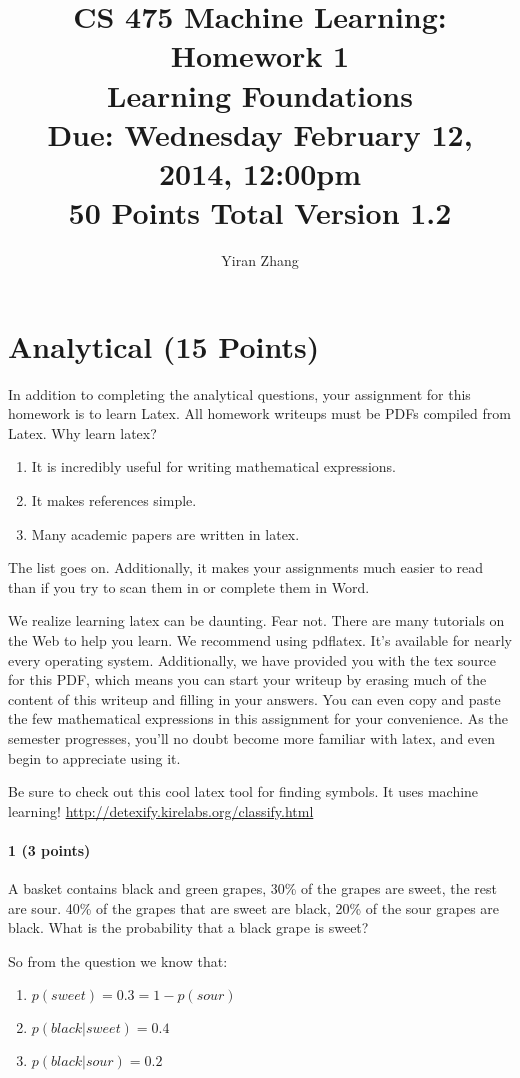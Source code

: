 \documentclass[11pt]{article}
\title{CS 475 Machine Learning: Homework 1\\Learning Foundations\\
\Large{Due: Wednesday February 12, 2014, 12:00pm}\\
50 Points Total \hspace{1cm} Version 1.2}
\author{Yiran Zhang}
\date{}
\begin{document}
\large
\maketitle
\thispagestyle{headings}

\vspace{-.5in}
\section{Analytical (15 Points)}
In addition to completing the analytical questions, your assignment for this homework is to learn Latex. All homework writeups must be PDFs compiled from Latex. Why learn latex?
\begin{enumerate}
\item It is incredibly useful for writing mathematical expressions.
\item It makes references simple.
\item Many academic papers are written in latex.
\end{enumerate}
The list goes on. Additionally, it makes your assignments much easier to read than if you try to scan them in or complete them in Word.

We realize learning latex can be daunting. Fear not. There are many tutorials on the Web to help you learn. We recommend using pdflatex. It's available for nearly every operating system. Additionally, we have provided you with the tex source for this PDF, which means you can start your writeup by erasing much of the content of this writeup and filling in your answers. You can even copy and paste the few mathematical expressions in this assignment for your convenience. As the semester progresses, you'll no doubt become more familiar with latex, and even begin to appreciate using it.

Be sure to check out this cool latex tool for finding symbols. It uses machine learning! \url{http://detexify.kirelabs.org/classify.html}

\paragraph{1 (3 points)} A basket contains black and green grapes, 30\% of the grapes are sweet, the rest are sour. 40\% of the grapes that are sweet are black, 20\% of the sour grapes are black. What is the probability that a black grape is sweet?

So from the question we know that:
\begin{enumerate}
\item $p(sweet) = 0.3 = 1 - p(sour)$
\item $p(black|sweet) = 0.4$
\item $p(black|sour) = 0.2$
\end{enumerate}
\end{document}
